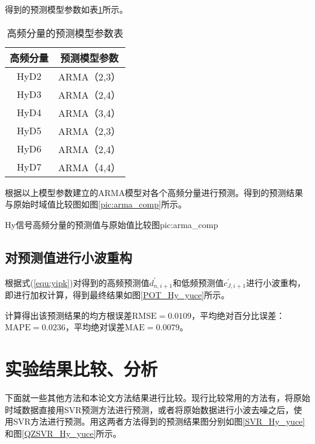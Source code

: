 得到的预测模型参数如表\ref{tab:gaopin_ARMA}所示。
\begin{table}[htbp] 
	\centering
	\caption{\label{tab:gaopin_ARMA}高频分量的预测模型参数表} 
	\begin{tabular}{cc} 
		\toprule 
		高频分量 & 预测模型参数 \\ 
		\midrule
		HyD2 &  ARMA（2,3） \\
		HyD3 &  ARMA（2,4） \\
		HyD4 &  ARMA（3,4） \\
		HyD5 &  ARMA（2,3） \\
		HyD6 &  ARMA（2,4） \\
		HyD7 &  ARMA（4,4） \\
		\bottomrule 
	\end{tabular} 
\end{table}

根据以上模型参数建立的ARMA模型对各个高频分量进行预测。得到的预测结果与原始时域值比较图如图\ref{pic:arma_comp}所示。
\begin{pics}[htbp]{Hy信号高频分量的预测值与原始值比较图}{pic:arma_comp}
\end{pics}
\clearpage

\subsection{对预测值进行小波重构}
根据式(\ref{equ:yipk})对得到的高频预测值$d_{n,i+1}^\prime$和低频预测值$c_{J,i+1}^\prime$进行小波重构，即进行加权计算，得到最终结果如图\ref{POT_Hy_yuce}所示。

计算得出该预测结果的均方根误差$\mathrm{RMSE} =0.0109$，平均绝对百分比误差：$\mathrm{MAPE}  =0.0236$，平均绝对误差$\mathrm{MAE} =0.0079$。

\section{实验结果比较、分析}
下面就一些其他方法和本论文方法结果进行比较。现行比较常用的方法有，将原始时域数据直接用SVR预测方法进行预测，或者将原始数据进行小波去噪之后，使用SVR方法进行预测。用这两者方法得到的预测结果图分别如图\ref{SVR_Hy_yuce}和图\ref{QZSVR_Hy_yuce}所示。

